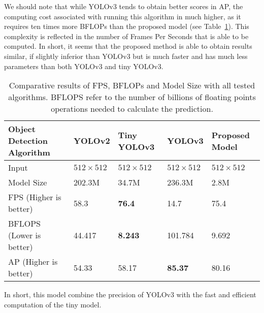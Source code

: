 We should note that while YOLOv3 tends to obtain better scores in AP, the computing cost associated with running this algorithm in much higher, as it requires ten times more BFLOPs than the proposed model (see Table~\ref{tab:perfSimple}). This complexity is reflected in the number of Frames Per Seconds that is able to be computed. In short, it seems that the proposed method is able to obtain results similar, if slightly inferior than YOLOv3 but is much faster and has much less parameters than both YOLOv3 and tiny YOLOv3. 
\begin{table}[ht]
	\centering
	\begin{tabular}{@{}lllll@{}}
		\toprule
		Object Detection Algorithm & YOLOv2           & Tiny YOLOv3      & YOLOv3           & Proposed Model   \\ \midrule
		Input                      & $512 \times 512$ & $512 \times 512$ & $512 \times 512$ & $512 \times 512$ \\
		Model Size                 & 202.3M           & 34.7M            & 236.3M           & 2.8M             \\ \bottomrule
		FPS (Higher is better)     & 58.3             & \textbf{76.4}    & 14.7             & 75.4             \\
		BFLOPS (Lower is better)   & 44.417           & \textbf{8.243}   & 101.784          & 9.692            \\ 
		AP (Higher is better)      & 54.33            & 58.17            & \textbf{85.37}   & 80.16            \\ \bottomrule
	\end{tabular}
	\caption{Comparative results of FPS, BFLOPs and Model Size with all tested algorithms. BFLOPS refer to the number of billions of floating points operations needed to calculate the prediction.}
	\label{tab:perfSimple}
\end{table}
\clearpage

In short, this model combine the precision of YOLOv3 with the fast and efficient computation of the tiny model. 
